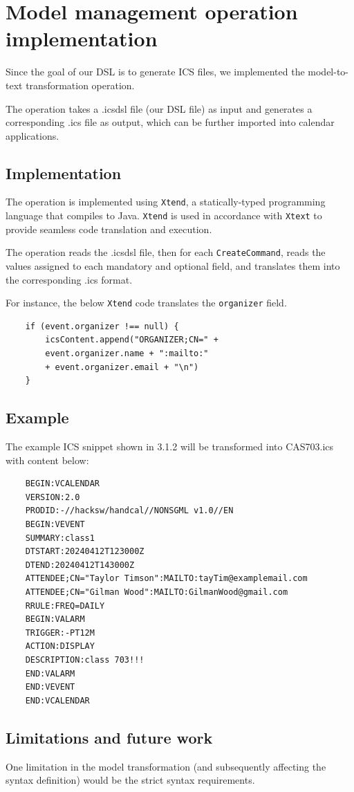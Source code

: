 \documentclass[12pt, letterpaper, twoside]{article}
\begin{document}
\section{Model management operation implementation}
Since the goal of our DSL is to generate ICS files, we implemented the model-to-text transformation operation. 

The operation takes a .icsdsl file (our DSL file) as input and generates a corresponding .ics file as output, which can be further imported into calendar applications.

\subsection{Implementation}

The operation is implemented using \texttt{Xtend}, a statically-typed programming language that compiles to Java. 
\texttt{Xtend} is used in accordance with \texttt{Xtext} to provide seamless code translation and execution. 

The operation reads the .icsdsl file, then for each \texttt{CreateCommand}, reads the values assigned to each mandatory and optional field, and translates them into the corresponding .ics format.

For instance, the below \texttt{Xtend} code translates the \texttt{organizer} field.
\begin{verbatim}
    if (event.organizer !== null) {
        icsContent.append("ORGANIZER;CN=" + 
        event.organizer.name + ":mailto:" 
        + event.organizer.email + "\n")
    }
\end{verbatim}

\subsection{Example}
The example ICS snippet shown in 3.1.2 will be transformed into CAS703.ics with content below:
\begin{verbatim}
    BEGIN:VCALENDAR
    VERSION:2.0
    PRODID:-//hacksw/handcal//NONSGML v1.0//EN
    BEGIN:VEVENT
    SUMMARY:class1
    DTSTART:20240412T123000Z
    DTEND:20240412T143000Z
    ATTENDEE;CN="Taylor Timson":MAILTO:tayTim@examplemail.com
    ATTENDEE;CN="Gilman Wood":MAILTO:GilmanWood@gmail.com
    RRULE:FREQ=DAILY
    BEGIN:VALARM
    TRIGGER:-PT12M
    ACTION:DISPLAY
    DESCRIPTION:class 703!!!
    END:VALARM
    END:VEVENT
    END:VCALENDAR
\end{verbatim}

\subsection{Limitations and future work}
One limitation in the model transformation (and subsequently affecting the syntax definition) would be the strict syntax requirements.  
\end{document}
